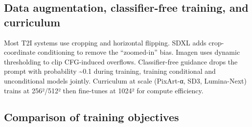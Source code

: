 \subsection{Data augmentation, classifier-free training, and curriculum}\label{data-augmentation-classifier-free-training-and-curriculum}

Most T2I systems use cropping and horizontal flipping. SDXL adds crop-coordinate conditioning to remove the ``zoomed-in'' bias. Imagen uses dynamic thresholding to clip CFG-induced overflows. Classifier-free guidance drops the prompt with probability \textasciitilde0.1 during training, training conditional and unconditional models jointly. Curriculum at scale (PixArt-α, SD3, Lumina-Next) trains at 256²/512² then fine-tunes at 1024² for compute efficiency.

\subsection{Comparison of training objectives}\label{comparison-of-training-objectives}

